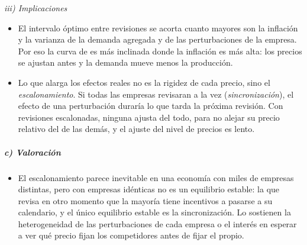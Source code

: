 \documentclass[11pt]{article}
\begin{document}
\hspace*{3.6em}\emph{iii) Implicaciones}

\begin{itemize}
\item El intervalo óptimo entre revisiones se acorta cuanto mayores son la inflación y la varianza de la demanda agregada y de las perturbaciones de la empresa. Por eso la curva de  es más inclinada donde la inflación es más alta: los precios se ajustan antes y la demanda mueve menos la producción\nocite{BallMankiwRomer1988}.
\item Lo que alarga los efectos reales no es la rigidez de cada precio, sino el \emph{escalonamiento}. Si todas las empresas revisaran a la vez (\emph{sincronización}), el efecto de una perturbación duraría lo que tarda la próxima revisión. Con revisiones escalonadas, ninguna ajusta del todo, para no alejar su precio relativo del de las demás, y el ajuste del nivel de precios es lento.
\end{itemize}

\subparagraph{c) Valoración}

\begin{itemize}
\item El escalonamiento parece inevitable en una economía con miles de empresas distintas, pero con empresas idénticas no es un equilibrio estable: la que revisa en otro momento que la mayoría tiene incentivos a pasarse a su calendario, y el único equilibrio estable es la sincronización\nocite{BallRomer1989Timing}. Lo sostienen la heterogeneidad de las perturbaciones de cada empresa o el interés en esperar a ver qué precio fijan los competidores antes de fijar el propio\nocite{BallCecchetti1988}.
\end{itemize}
\end{document}
